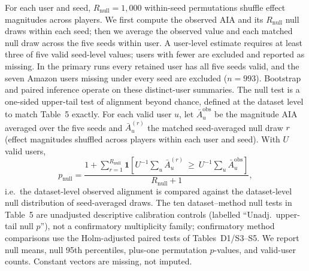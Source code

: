 \documentclass[pdflatex,sn-mathphys-num]{sn-jnl}
\theoremstyle{thmstyleone}
\theoremstyle{thmstyletwo}
\theoremstyle{thmstylethree}
\begin{document}
For each user and seed, $R_{\mathrm{null}}=1{,}000$ within-seed permutations shuffle effect magnitudes across players. We first compute the observed AIA and its $R_{\mathrm{null}}$ null draws within each seed; then we average the observed value and each matched null draw across the five seeds within user. A user-level estimate requires at least three of five valid seed-level values; users with fewer are excluded and reported as missing. In the primary runs every retained user has all five seeds valid, and the seven Amazon users missing under every seed are excluded ($n=993$). Bootstrap and paired inference operate on these distinct-user summaries. The null test is a one-sided upper-tail test of alignment beyond chance, defined at the dataset level to match Table~5 exactly. For each valid user $u$, let $\bar A_u^{\mathrm{obs}}$ be the magnitude AIA averaged over the five seeds and $\bar A_u^{(r)}$ the matched seed-averaged null draw $r$ (effect magnitudes shuffled across players within each user and seed). With $U$ valid users,
\begin{equation}
p_{\mathrm{null}}=
\frac{1+\sum_{r=1}^{R_{\mathrm{null}}}\mathbf{1}\left[U^{-1}\textstyle\sum_u \bar A_u^{(r)}\ \ge\ U^{-1}\textstyle\sum_u \bar A_u^{\mathrm{obs}}\right]}{R_{\mathrm{null}}+1},
\label{eq:null-p}
\end{equation}
i.e.\ the dataset-level observed alignment is compared against the dataset-level null distribution of seed-averaged draws. The ten dataset--method null tests in Table~5 are unadjusted descriptive calibration controls (labelled ``Unadj.\ upper-tail null $p$''), not a confirmatory multiplicity family; confirmatory method comparisons use the Holm-adjusted paired tests of Tables~D1/S3--S5. We report null means, null 95th percentiles, plus-one permutation $p$-values, and valid-user counts. Constant vectors are missing, not imputed.

\FloatBarrier
\end{document}
